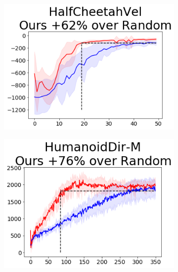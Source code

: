 \begin{figure}[t]
{        \begin{subfigure}{0.15\paperwidth}
            \includegraphics[width=\linewidth]{chapter_2/fig/init-sac-vs-train-HalfCheetahVel.png}
        \end{subfigure}

        \begin{subfigure}{0.15\paperwidth}
            \includegraphics[width=\linewidth]{chapter_2/fig/init-sac-vs-train-HumanoidDir-M.png}
        \end{subfigure}

}
\end{figure}
